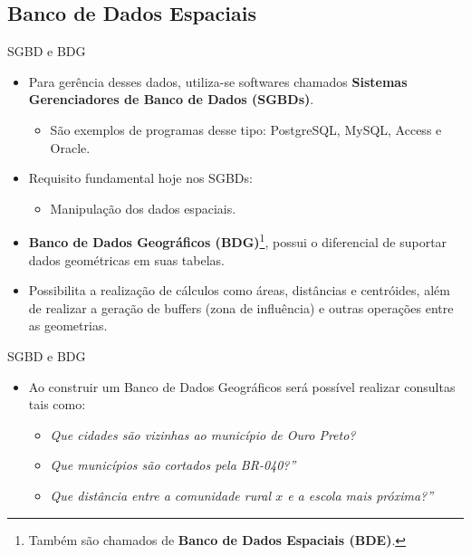 	\subsection{Banco de Dados Espaciais}

		\begin{frame}{SGBD e BDG}
			\begin{itemize}
				\setlength{\itemsep}{1em}
				\item Para gerência desses dados, utiliza-se softwares chamados \textbf{Sistemas Gerenciadores de Banco de Dados (SGBDs)}. 
				\begin{itemize}
					\item São exemplos de programas desse tipo: PostgreSQL, MySQL, Access e Oracle.
				\end{itemize}
				
				\item Requisito fundamental hoje nos SGBDs:
				\begin{itemize}
					\item Manipulação dos dados espaciais.
				\end{itemize}
				
				\item \textbf{Banco de Dados Geográficos (BDG)}\footnote{Também são chamados de \textbf{Banco de Dados Espaciais (BDE)}.}, possui o diferencial de suportar dados geométricas em suas tabelas.
	
				\item Possibilita a realização de cálculos como áreas, distâncias e centróides, além de realizar a geração de buffers (zona de influência) e outras operações entre as geometrias.
			\end{itemize}
		\end{frame}

		\begin{frame}{SGBD e BDG}
			\begin{itemize}
				\item Ao construir um Banco de Dados Geográficos será possível realizar consultas tais como:
	
				\begin{itemize}
					\setlength{\itemsep}{1.2em}
					\item \textit{Que cidades são vizinhas ao município de Ouro Preto?}
					\item \textit{Que municípios são cortados pela BR-040?”}
					\item \textit{Que distância entre a comunidade rural $x$ e a escola mais próxima?”}
				\end{itemize}
			\end{itemize}
		\end{frame}

